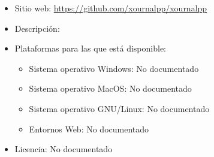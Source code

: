 \documentclass[11pt]{article}
\newcommand{\nodoc}{No documentado}
\begin{document}
\begin{itemize}
\item Sitio web: \url{https://github.com/xournalpp/xournalpp}
\item Descripción:
\item Plataformas para las que está disponible:
  \begin{itemize}
  \item Sistema operativo Windows: \nodoc
  \item Sistema operativo MacOS: \nodoc
  \item Sistema operativo GNU/Linux: \nodoc
  \item Entornos Web: \nodoc
  \end{itemize}
\item Licencia: \nodoc
\end{itemize}
\end{document}
